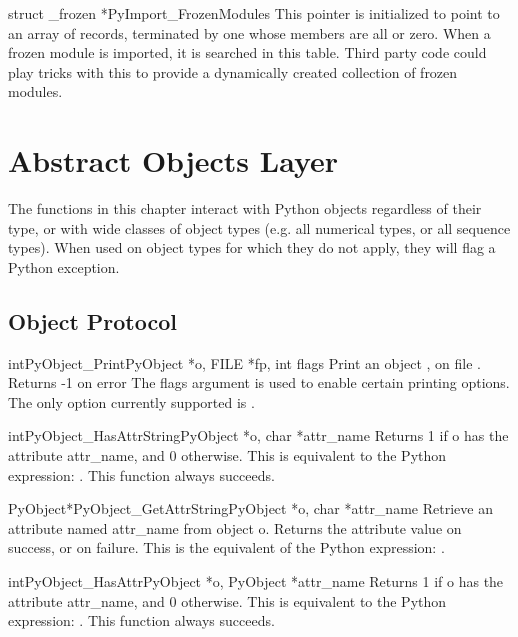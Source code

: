 \documentclass[twoside,openright]{report}
\begin{document}
\begin{cvardesc}{struct _frozen *}{PyImport_FrozenModules}
This pointer is initialized to point to an array of  records, terminated by one whose members are all \NULL{}
or zero.  When a frozen module is imported, it is searched in this
table.  Third party code could play tricks with this to provide a
dynamically created collection of frozen modules.
\end{cvardesc}


\chapter{Abstract Objects Layer}

The functions in this chapter interact with Python objects regardless
of their type, or with wide classes of object types (e.g. all
numerical types, or all sequence types).  When used on object types
for which they do not apply, they will flag a Python exception.

\section{Object Protocol}

\begin{cfuncdesc}{int}{PyObject_Print}{PyObject *o, FILE *fp, int flags}
Print an object , on file .  Returns -1 on error
The flags argument is used to enable certain printing
options. The only option currently supported is . 
\end{cfuncdesc}

\begin{cfuncdesc}{int}{PyObject_HasAttrString}{PyObject *o, char *attr_name}
Returns 1 if o has the attribute attr_name, and 0 otherwise.
This is equivalent to the Python expression:
.
This function always succeeds.
\end{cfuncdesc}

\begin{cfuncdesc}{PyObject*}{PyObject_GetAttrString}{PyObject *o, char *attr_name}
Retrieve an attribute named attr_name from object o.
Returns the attribute value on success, or \NULL{} on failure.
This is the equivalent of the Python expression: .
\end{cfuncdesc}


\begin{cfuncdesc}{int}{PyObject_HasAttr}{PyObject *o, PyObject *attr_name}
Returns 1 if o has the attribute attr_name, and 0 otherwise.
This is equivalent to the Python expression:
. 
This function always succeeds.
\end{cfuncdesc}
\end{document}
